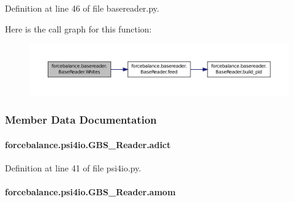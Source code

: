 Definition at line 46 of file basereader.\-py.



Here is the call graph for this function\-:\nopagebreak
\begin{figure}[H]
\begin{center}
\leavevmode
\includegraphics[width=350pt]{classforcebalance_1_1basereader_1_1BaseReader_a2819ab1e523b6ff8e7467e56e3582386_cgraph}
\end{center}
\end{figure}




\subsubsection{Member Data Documentation}
\hypertarget{classforcebalance_1_1psi4io_1_1GBS__Reader_ac42c3b29532e11a0d8d78b48347739ff}{
\paragraph[{adict}]{\setlength{\rightskip}{0pt plus 5cm}forcebalance.\-psi4io.\-G\-B\-S\-\_\-\-Reader.\-adict}}\label{classforcebalance_1_1psi4io_1_1GBS__Reader_ac42c3b29532e11a0d8d78b48347739ff}


Definition at line 41 of file psi4io.\-py.

\hypertarget{classforcebalance_1_1psi4io_1_1GBS__Reader_a322f36949ce67389f107cac80e8f5b40}{
\paragraph[{amom}]{\setlength{\rightskip}{0pt plus 5cm}forcebalance.\-psi4io.\-G\-B\-S\-\_\-\-Reader.\-amom}}\label{classforcebalance_1_1psi4io_1_1GBS__Reader_a322f36949ce67389f107cac80e8f5b40}


